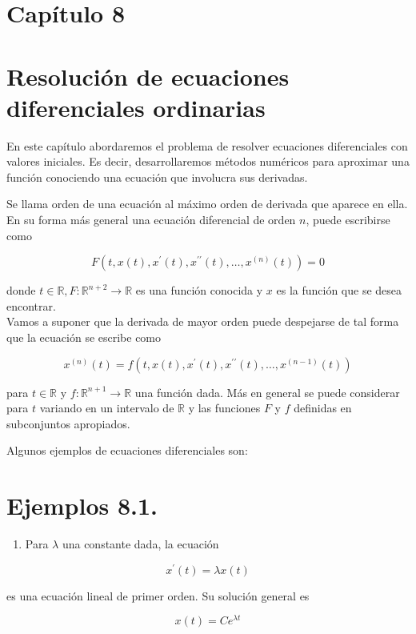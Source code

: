 \documentclass[10pt]{article}
\begin{document}
\section*{Capítulo 8}
\section*{Resolución de ecuaciones diferenciales ordinarias}
En este capítulo abordaremos el problema de resolver ecuaciones diferenciales con valores iniciales. Es decir, desarrollaremos métodos numéricos para aproximar una función conociendo una ecuación que involucra sus derivadas.

Se llama orden de una ecuación al máximo orden de derivada que aparece en ella. En su forma más general una ecuación diferencial de orden $n$, puede escribirse como

$$
F\left(t, x(t), x^{\prime}(t), x^{\prime \prime}(t), \ldots, x^{(n)}(t)\right)=0
$$

donde $t \in \mathbb{R}, F: \mathbb{R}^{n+2} \rightarrow \mathbb{R}$ es una función conocida y $x$ es la función que se desea encontrar.\\
Vamos a suponer que la derivada de mayor orden puede despejarse de tal forma que la ecuación se escribe como


\begin{equation*}
x^{(n)}(t)=f\left(t, x(t), x^{\prime}(t), x^{\prime \prime}(t), \ldots, x^{(n-1)}(t)\right) \tag{8.1}
\end{equation*}


para $t \in \mathbb{R}$ y $f: \mathbb{R}^{n+1} \rightarrow \mathbb{R}$ una función dada. Más en general se puede considerar para $t$ variando en un intervalo de $\mathbb{R}$ y las funciones $F$ y $f$ definidas en subconjuntos apropiados.

Algunos ejemplos de ecuaciones diferenciales son:

\section*{Ejemplos 8.1.}
\begin{enumerate}
  \item Para $\lambda$ una constante dada, la ecuación
\end{enumerate}

$$
x^{\prime}(t)=\lambda x(t)
$$

es una ecuación lineal de primer orden. Su solución general es

$$
x(t)=C e^{\lambda t}
$$
\end{document}
